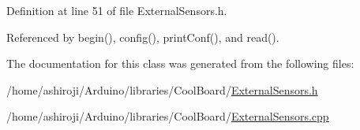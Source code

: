 Definition at line 51 of file External\+Sensors.\+h.



Referenced by begin(), config(), print\+Conf(), and read().



The documentation for this class was generated from the following files\+:\begin{DoxyCompactItemize}
\item 
/home/ashiroji/\+Arduino/libraries/\+Cool\+Board/\hyperlink{ExternalSensors_8h}{External\+Sensors.\+h}\item 
/home/ashiroji/\+Arduino/libraries/\+Cool\+Board/\hyperlink{ExternalSensors_8cpp}{External\+Sensors.\+cpp}\end{DoxyCompactItemize}
